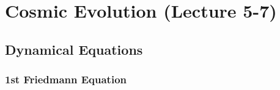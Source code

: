 
\chapter{Cosmic Evolution (Lecture 5-7)}

\section{Dynamical Equations}
\subsection{1st Friedmann Equation}
